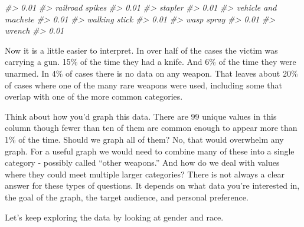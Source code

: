 \documentclass[
]{krantz}
\makeatletter
\newenvironment{Shaded}{\begin{snugshade}}{\end{snugshade}}
\newcommand{\CommentTok}[1]{\textcolor[rgb]{0.37,0.37,0.37}{\textit{#1}}}
\newcommand{\DecValTok}[1]{\textcolor[rgb]{0.06,0.06,0.06}{#1}}
\newcommand{\FunctionTok}[1]{\textcolor[rgb]{0,0,0}{#1}}
\newcommand{\NormalTok}[1]{#1}
\newcommand{\SpecialCharTok}[1]{\textcolor[rgb]{0,0,0}{#1}}
\newenvironment{kframe}{%
\medskip{}
\setlength{\fboxsep}{.8em}
 \def\at@end@of@kframe{}%
 \ifinner\ifhmode%
  \def\at@end@of@kframe{\end{minipage}}%
  \begin{minipage}{\columnwidth}%
 \fi\fi%
 \def\FrameCommand##1{\hskip\@totalleftmargin \hskip-\fboxsep
 \colorbox{shadecolor}{##1}\hskip-\fboxsep
     \hskip-\linewidth \hskip-\@totalleftmargin \hskip\columnwidth}%
 \MakeFramed {\advance\hsize-\width
   \@totalleftmargin\z@ \linewidth\hsize
   \@setminipage}}%
 {\par\unskip\endMakeFramed%
 \at@end@of@kframe}
\renewenvironment{Shaded}{\begin{kframe}}{\end{kframe}}
\makeatother
\begin{document}
\begin{Shaded}
\begin{Highlighting}[]
\CommentTok{\#\textgreater{}                             0.01 }
\CommentTok{\#\textgreater{}                  railroad spikes }
\CommentTok{\#\textgreater{}                             0.01 }
\CommentTok{\#\textgreater{}                          stapler }
\CommentTok{\#\textgreater{}                             0.01 }
\CommentTok{\#\textgreater{}              vehicle and machete }
\CommentTok{\#\textgreater{}                             0.01 }
\CommentTok{\#\textgreater{}                    walking stick }
\CommentTok{\#\textgreater{}                             0.01 }
\CommentTok{\#\textgreater{}                       wasp spray }
\CommentTok{\#\textgreater{}                             0.01 }
\CommentTok{\#\textgreater{}                           wrench }
\CommentTok{\#\textgreater{}                             0.01}
\end{Highlighting}
\end{Shaded}

Now it is a little easier to interpret. In over half of the cases the victim was carrying a gun. 15\% of the time they had a knife. And 6\% of the time they were unarmed. In 4\% of cases there is no data on any weapon. That leaves about 20\% of cases where one of the many rare weapons were used, including some that overlap with one of the more common categories.

Think about how you'd graph this data. There are 99 unique values in this column though fewer than ten of them are common enough to appear more than 1\% of the time. Should we graph all of them? No, that would overwhelm any graph. For a useful graph we would need to combine many of these into a single category - possibly called ``other weapons.'' And how do we deal with values where they could meet multiple larger categories? There is not always a clear answer for these types of questions. It depends on what data you're interested in, the goal of the graph, the target audience, and personal preference.

Let's keep exploring the data by looking at gender and race.

\begin{Shaded}
\end{Shaded}
\end{document}
